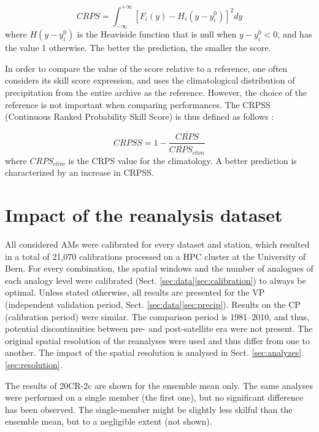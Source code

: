 \documentclass{ametsoc}
\begin{document}
\begin{equation}
\label{eq:CRPS}
CRPS = \int_{-\infty}^{+\infty} \left[ F_{i}(y)-H_{i}(y-y_{i}^{0})\right]^{2} dy
\end{equation}
where $H(y-y_{i}^{0})$ is the Heaviside function that is null when $y-y_{i}^{0}<0$, and has the value 1 otherwise. The better the prediction, the smaller the score.

In order to compare the value of the score relative to a reference, one often considers its skill score expression, and uses the climatological distribution of precipitation from the entire archive as the reference. However, the choice of the reference is not important when comparing performances. The CRPSS (Continuous Ranked Probability Skill Score) is thus defined as follows \citep{Bradley2011}:

\begin{equation}
\label{eq:CRPSS}
CRPSS = 1-\frac{\overline{CRPS}}{\overline{CRPS}_{clim}}
\end{equation}
where $CRPS_{clim}$ is the CRPS value for the climatology. A better prediction is characterized by an increase in CRPSS.


\section{Impact of the reanalysis dataset}
\label{sec:influence}

All considered AMs were calibrated for every dataset and station, which resulted in a total of 21,070 calibrations processed on a HPC cluster at the University of Bern. For every combination, the spatial windows and the number of analogues of each analogy level were calibrated (Sect. \ref{sec:data}\ref{sec:calibration}) to always be optimal. Unless stated otherwise, all results are presented for the VP (independent validation period, Sect. \ref{sec:data}\ref{sec:precip}). Results on the CP (calibration period) were similar. The comparison period is 1981--2010, and thus, potential discontinuities between pre- and post-satellite era were not present. The original spatial resolution of the reanalyses were used and thus differ from one to another. The impact of the spatial resolution is analysed in Sect. \ref{sec:analyzes}.\ref{sec:resolution}.

The results of 20CR-2c are shown for the ensemble mean only. The same analyses were performed on a single member (the first one), but no significant difference has been observed. The single-member might be slightly less skilful than the ensemble mean, but to a negligible extent (not shown).
\end{document}
